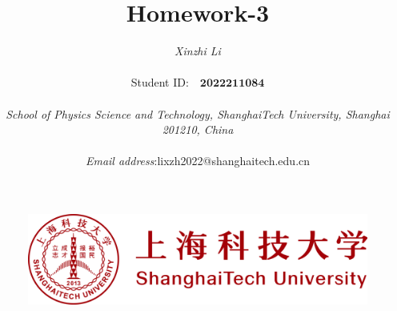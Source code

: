 \documentclass[a4paper,9pt]{article}
\begin{document}
\pagestyle{fancy}
\title{\textbf{\Huge{Homework-3}}}

\author{\textit{Xinzhi Li} \\\quad\\Student ID:~~$\boldsymbol{2022211084}$\\\quad\\ \textit{School of Physics Science and Technology, ShanghaiTech University, Shanghai 201210, China}\\\quad \\ \textit{Email address}:\quad lixzh2022@shanghaitech.edu.cn}


\begin{figure}[t]
\centering
\includegraphics[width=1\columnwidth]{logo/row.png}
\end{figure}

\maketitle\thispagestyle{empty}
\newpage
\setcounter{page}{1}
\end{document}
